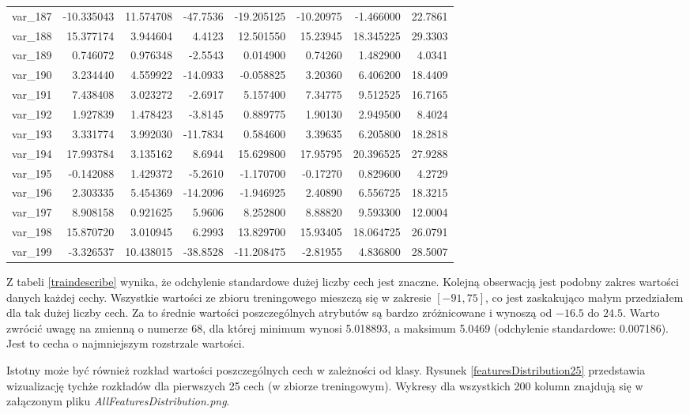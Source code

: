 \documentclass[12pt]{article}
\begin{document}
\begin{longtable}{lrrrrrrr}
 var\_187 & -10.335043 &  11.574708 & -47.7536 & -19.205125 & -10.20975 &  -1.466000 &  22.7861 \\
 var\_188 &  15.377174 &   3.944604 &   4.4123 &  12.501550 &  15.23945 &  18.345225 &  29.3303 \\
 var\_189 &   0.746072 &   0.976348 &  -2.5543 &   0.014900 &   0.74260 &   1.482900 &   4.0341 \\
 var\_190 &   3.234440 &   4.559922 & -14.0933 &  -0.058825 &   3.20360 &   6.406200 &  18.4409 \\
 var\_191 &   7.438408 &   3.023272 &  -2.6917 &   5.157400 &   7.34775 &   9.512525 &  16.7165 \\
 var\_192 &   1.927839 &   1.478423 &  -3.8145 &   0.889775 &   1.90130 &   2.949500 &   8.4024 \\
 var\_193 &   3.331774 &   3.992030 & -11.7834 &   0.584600 &   3.39635 &   6.205800 &  18.2818 \\
 var\_194 &  17.993784 &   3.135162 &   8.6944 &  15.629800 &  17.95795 &  20.396525 &  27.9288 \\
 var\_195 &  -0.142088 &   1.429372 &  -5.2610 &  -1.170700 &  -0.17270 &   0.829600 &   4.2729 \\
 var\_196 &   2.303335 &   5.454369 & -14.2096 &  -1.946925 &   2.40890 &   6.556725 &  18.3215 \\
 var\_197 &   8.908158 &   0.921625 &   5.9606 &   8.252800 &   8.88820 &   9.593300 &  12.0004 \\
 var\_198 &  15.870720 &   3.010945 &   6.2993 &  13.829700 &  15.93405 &  18.064725 &  26.0791 \\
 var\_199 &  -3.326537 &  10.438015 & -38.8528 & -11.208475 &  -2.81955 &   4.836800 &  28.5007 \\
\end{longtable}

Z tabeli \ref{traindescribe} wynika, że odchylenie standardowe dużej liczby cech jest znaczne. Kolejną obserwacją jest podobny zakres wartości danych każdej cechy. Wszystkie wartości ze zbioru treningowego mieszczą się w zakresie $[-91, 75]$, co jest zaskakująco małym przedziałem dla tak dużej liczby cech. Za to średnie wartości poszczególnych atrybutów są bardzo zróżnicowane i wynoszą od $-16.5$ do $24.5$. Warto zwrócić uwagę na zmienną o numerze $68$, dla której minimum wynosi 5.018893, a maksimum 5.0469 (odchylenie standardowe: 0.007186). Jest to cecha o najmniejszym rozstrzale wartości.
\newline 

Istotny może być również rozkład wartości poszczególnych cech w zależności od klasy.
Rysunek \ref{featuresDistribution25} przedstawia wizualizację tychże rozkładów dla pierwszych 25 cech (w zbiorze treningowym). Wykresy dla wszystkich 200 kolumn znajdują się w załączonym pliku \textit{AllFeaturesDistribution.png}.
\end{document}

